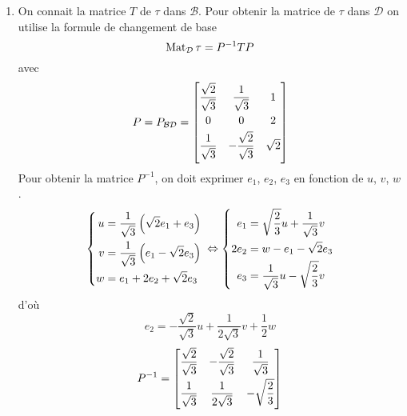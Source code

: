 \begin{enumerate}
\begin{enumerate}
\item On connait la matrice $T$ de $\tau$ dans $\mathcal B$. Pour obtenir la matrice de $\tau$ dans $\mathcal D$ on utilise la formule de changement de base
\begin{displaymath}
 \operatorname{Mat}_{\mathcal D} \tau = P^{-1} T P
\end{displaymath}
avec
\begin{displaymath}
 P = P_{\mathcal B \mathcal D}=
\begin{bmatrix}
 \dfrac{\sqrt{2}}{\sqrt{3}} & \dfrac{1}{\sqrt{3}} & 1 \vspace{3pt}\\
0 & 0 &2 \vspace{3pt}\\
\dfrac{1}{\sqrt{3}} & -\dfrac{\sqrt{2}}{\sqrt{3}} & \sqrt{2} \vspace{3pt}
\end{bmatrix}
\end{displaymath}
Pour obtenir la matrice $P^{-1}$, on doit exprimer $e_1$, $e_2$, $e_3$ en fonction de $u$, $v$, $w$.
\begin{displaymath}
\left\lbrace
\begin{aligned}
 u &= \dfrac{1}{\sqrt{3}}\left(\sqrt{2}e_1 + e_3 \right) \\
v &= \dfrac{1}{\sqrt{3}}\left(e_1 -\sqrt{2} e_3 \right) \\
w &=  e_1+2e_2+\sqrt{2}e_3 
\end{aligned}
\right. 
\\
\Leftrightarrow
\left\lbrace 
\begin{aligned}
 e_1 &= \sqrt{\dfrac{2}{3}}u + \dfrac{1}{\sqrt{3}}v \\
 2e_2 &= w -e_1 -\sqrt{2}e_3 \\
 e_3 &= \dfrac{1}{\sqrt{3}}u - \sqrt{\dfrac{2}{3}}v
\end{aligned}
\right. 
\end{displaymath}
d'où
\begin{displaymath}
 e_2 = -\dfrac{\sqrt{2}}{\sqrt{3}}u + \dfrac{1}{2\sqrt{3}}v + \dfrac{1}{2}w
\end{displaymath}
\begin{displaymath}
 P^{-1}=
\begin{bmatrix}
 \dfrac{\sqrt{2}}{\sqrt{3}} & -\dfrac{\sqrt{2}}{\sqrt{3}} & \dfrac{1}{\sqrt{3}} \vspace{3pt}\\
\dfrac{1}{\sqrt{3}}& \dfrac{1}{2\sqrt{3}} & - \sqrt{\dfrac{2}{3}} \vspace{3pt}\\

\end{bmatrix}
\end{displaymath}
\end{enumerate}
\end{enumerate}
